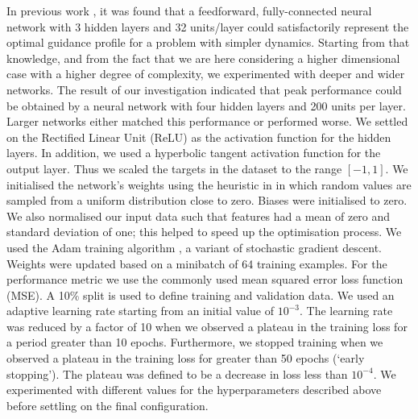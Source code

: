 \documentclass[graybox]{svmult}
\begin{document}
In previous work \cite{sanchez2016real}, it was found that a feedforward, fully-connected neural network with 3 hidden layers and 32 units/layer could satisfactorily represent the optimal guidance profile for a problem with simpler dynamics.
Starting from that knowledge, and from the fact that we are here considering a higher dimensional case with a higher degree of complexity, we experimented with deeper and wider networks.
The result of our investigation indicated that peak performance could be obtained by a neural network with four hidden layers and 200 units per layer.
Larger networks either matched this performance or performed worse.
We settled on the Rectified Linear Unit (ReLU) as the activation function for the hidden layers.
In addition, we used a hyperbolic tangent activation function for the output layer.
Thus we scaled the targets in the dataset to the range $[-1,1]$.
We initialised the network's weights using the heuristic in \cite{glorot2010understanding} in which random values are sampled from a uniform distribution close to zero.
Biases were initialised to zero.
We also normalised our input data such that features had a mean of zero and standard deviation of one; this helped to speed up the optimisation process.
We used the Adam training algorithm \cite{DBLP:journals/corr/KingmaB14}, a variant of stochastic gradient descent.
Weights were updated based on a minibatch of 64 training examples.
For the performance metric we use the commonly used mean squared error loss function (MSE). 
A 10\% split is used to define training and validation data.
We used an adaptive learning rate starting from an initial value of $10^{-3}$.
The learning rate was reduced by a factor of 10 when we observed a plateau in the training loss for a period greater than 10 epochs.
Furthermore, we stopped training when we observed a plateau in the training loss for greater than 50 epochs (`early stopping').
The plateau was defined to be a decrease in loss less than $10^{-4}$.
We experimented with different values for the hyperparameters described above before settling on the final configuration.
\end{document}
